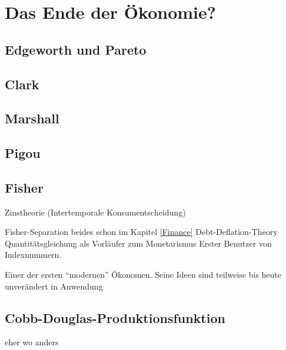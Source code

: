%
%
%

\chapter{Das Ende der Ökonomie?}
\label{Neoklassik}

\section{Edgeworth und Pareto}

\section{Clark}

\section{Marshall}

\section{Pigou}

\section{Fisher}
Zinstheorie (Intertemporale Konsumentscheidung)

Fisher-Separation
beides schon im Kapitel \ref{Finance}
Debt-Deflation-Theory
Quantitätsgleichung als Vorläufer zum Monetarismus
Erster Benutzer von Indexnummern.

Einer der ersten "`modernen"' Ökonomen. Seine Ideen sind teilweise bis heute unverändert in Anwendung

\textcite{Tobin2005}

\section{Cobb-Douglas-Produktionsfunktion} \label{sec: Cobb-Douglas-Produktionsfunktion}
eher wo anders